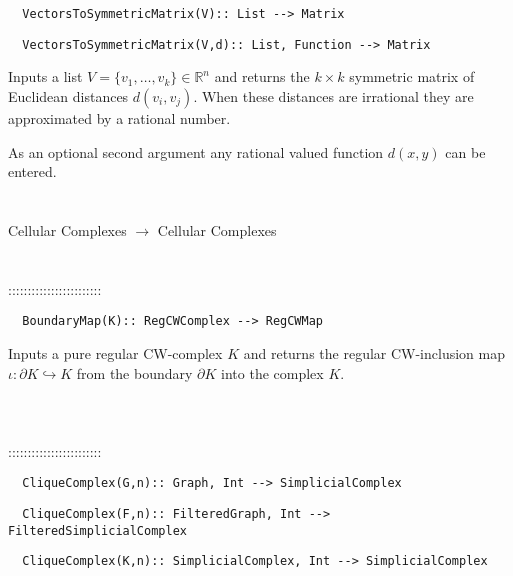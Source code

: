 \documentclass[a4paper,11pt]{report}
\begin{document}
{\begin{verbatim}  VectorsToSymmetricMatrix(V):: List --> Matrix
\end{verbatim}
 
\begin{verbatim}  VectorsToSymmetricMatrix(V,d):: List, Function --> Matrix
\end{verbatim}


 

 Inputs a list $V =\{ v_1, \ldots, v_k\} \in \mathbb R^n$ and returns the $k \times k$ symmetric matrix of Euclidean distances $d(v_i, v_j)$. When these distances are irrational they are approximated by a rational
number. 

 As an optional second argument any rational valued function $d(x,y)$ can be entered. \\
 \\
 \\
 Cellular Complexes $\longrightarrow$ Cellular Complexes \\
 \\
 \\
 ::::::::::::::::::::::::\\
 
\begin{verbatim}  BoundaryMap(K):: RegCWComplex --> RegCWMap
\end{verbatim}


 

 Inputs a pure regular CW-complex $K$ and returns the regular CW-inclusion map $\iota \colon \partial K \hookrightarrow K$ from the boundary $\partial K$ into the complex $K$. \\
 \\
 \\
 \\
 ::::::::::::::::::::::::\\
 
\begin{verbatim}  CliqueComplex(G,n):: Graph, Int --> SimplicialComplex
\end{verbatim}
 
\begin{verbatim}  CliqueComplex(F,n):: FilteredGraph, Int --> FilteredSimplicialComplex
\end{verbatim}
 
\begin{verbatim}  CliqueComplex(K,n):: SimplicialComplex, Int --> SimplicialComplex
\end{verbatim}


}
\end{document}
